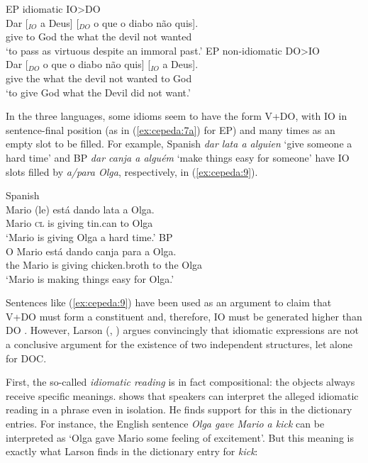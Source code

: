 \documentclass[output=paper,colorlinks,citecolor=brown]{./langscibook}
\begin{document}
\ea%
    \label{ex:cepeda:8}
	\ea\label{ex:cepeda:8a}
	EP idiomatic IO>DO\\
	\gll Dar [$_{IO}$ a  Deus] [$_{DO}$ o que o diabo não quis].\\
		give \hspaceThis{[$_{IO}$} to God \hspaceThis{[$_{DO}$} the what the devil  not  wanted\\
	\glt ‘to pass as virtuous despite an immoral past.’
	\ex\label{ex:cepeda:8b}
	EP non-idiomatic DO>IO\\
	\gll Dar [$_{DO}$ o que o diabo não quis] [$_{IO}$ a  Deus]. \\
		give \hspaceThis{[$_{DO}$} the what the devil  not  wanted \hspaceThis{[$_{IO}$} to God\\
	\glt ‘to give God what the Devil did not want.’
	\z
\z

In the three languages, some idioms seem to have the form V+DO, with IO in sentence-final position (as in (\ref{ex:cepeda:7a}) for EP) and many times as an empty slot to be filled. For example, Spanish \textit{dar lata a alguien} ‘give someone a hard time’ and BP \textit{dar canja a alguém} ‘make things easy for someone’ have IO slots filled by \textit{a/para Olga}, respectively, in (\ref{ex:cepeda:9}).

\ea%
    \label{ex:cepeda:9}
	\ea\label{ex:cepeda:9a}
	Spanish\\
	\gll Mario (le) está dando lata a  Olga.\\
		Mario \textsc{cl} is giving tin.can to Olga\\
	\glt ‘Mario is giving Olga a hard time.’
	\ex\label{ex:cepeda:9b}
	BP\\
	\gll O Mario está dando canja para a Olga.\\
		the Mario is    giving chicken.broth  to   the Olga\\
	\glt ‘Mario is making things easy for Olga.’
	\z
\z

Sentences like (\ref{ex:cepeda:9}) have been used as an argument to claim that V+DO must form a constituent and, therefore, IO must be generated higher than DO \citep{Bleam2003}. However, Larson (\citeyear{Larson2014}, \citeyear{Larson2017}) argues convincingly that idiomatic expressions are not a conclusive argument for the existence of two independent structures, let alone for DOC.

First, the so-called \textit{idiomatic reading} is in fact compositional: the objects always receive specific meanings. \citet{Larson2017} shows that speakers can interpret the alleged idiomatic reading in a phrase even in isolation. He finds support for this in the dictionary entries. For instance, the English sentence \textit{Olga gave Mario a kick} can be interpreted as ‘Olga gave Mario some feeling of excitement’. But this meaning is exactly what Larson finds in the dictionary entry for \textit{kick}:
\end{document}
